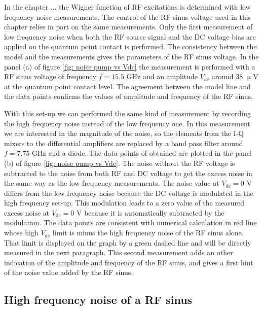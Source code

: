 In the chapter ... the Wigner function of RF excitations is determined with low frequency noise measurements.
The control of the RF sinus voltage used in this chapter relies in part on the same measurements.
Only the first measurement of low frequency noise when both the RF source signal and the DC voltage bias are applied on the quantum point contact is performed.
The consistency between the model and the measurements gives the parameters of the RF sinus voltage.
In the panel (a) of figure \ref{fig: noise pump vs Vdc} the measurement is performed with a RF sinus voltage of frequency $f = 15.5$ GHz and an amplitude $V_{ac}$ around 38 $\upmu$V at the quantum point contact level.
The agreement between the model line and the data points confirms the values of amplitude and frequency of the RF sinus.

With this set-up we can performed the same kind of measurement by recording the high frequency noise instead of the low frequency one.
In this measurement we are interested in the magnitude of the noise, so the elements from the I-Q mixers to the differential amplifiers are replaced by a band pass filter around $f = 7.75$ GHz and a diode. 
The data points of obtained are plotted in the panel (b) of figure \ref{fig: noise pump vs Vdc}.
The noise without the RF voltage is subtracted to the noise from both RF and DC voltage to get the excess noise in the same way as the low frequency measurements.
The noise value at $V_{\mathrm{dc}} = 0$ V differs from the low frequency noise because the DC voltage is modulated in the high frequency set-up.
This modulation leads to a zero value of the measured excess noise at $V_{\mathrm{dc}} = 0$ V because it is automatically subtracted by the modulation.
The data points are consistent with numerical calculation in red line whose high $V_{\mathrm{dc}}$ limit is minus the high frequency noise of the RF sinus alone.
That limit is displayed on the graph by a green dashed line and will be directly measured in the next paragraph.
This second measurement adds an other indication of the amplitude and frequency of the RF sinus, and gives a first hint of the noise value added by the RF sinus. 

\subsection{High frequency noise of a RF sinus}

